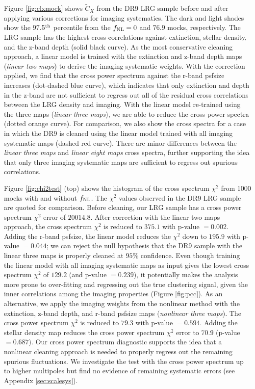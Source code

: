 Figure \ref{fig:clxmock} shows $\tilde{C}_{X}$ from the DR9 LRG sample before and after applying various corrections for imaging systematics. The dark and light shades show the 97.5$^{\rm th}$ percentile from the $f_{\rm NL}=0$ and $76.9$ mocks, respectively. The LRG sample has the highest cross-correlations against extinction, stellar density, and the z-band depth (solid black curve). As the most conservative cleaning approach, a linear model is trained with the extinction and z-band depth maps (\textit{linear two maps}) to derive the imaging systematic weights. With the correction applied, we find that the cross power spectrum against the r-band psfsize increases (dot-dashed blue curve), which indicates that only extinction and depth in the z-band are not sufficient to regress out all of the residual cross correlations between the LRG density and imaging. With the linear model re-trained using the three maps (\textit{linear three maps}), we are able to reduce the cross power spectra (dotted orange curve). For comparison, we also show the cross spectra for a case in which the DR9 is cleaned using the linear model trained with all imaging systematic maps (dashed red curve). There are minor differences between the \textit{linear three maps} and \textit{linear eight maps} cross spectra, further supporting the idea that only three imaging systematic maps are sufficient to regress out spurious correlations.

Figure \ref{fig:chi2test} (top)  shows the histogram of the cross spectrum $\chi^{2}$ from 1000 mocks with and without $f_{\rm NL}$. The $\chi^{2}$ values observed in the DR9 LRG sample are quoted for comparison. Before cleaning, our LRG sample has a cross power spectrum $\chi^{2}$ error of $20014.8$. After correction with the linear two maps approach, the cross spectrum $\chi^{2}$ is reduced to $375.1$ with p-value $=0.002$. Adding the r-band psfsize, the linear model reduces the $\chi^{2}$ down to $195.9$ with p-value $=0.044$; we can reject the null hypothesis that the DR9 sample with the linear three maps is properly cleaned at $95\%$ confidence. Even though training the linear model with all imaging systematic maps as input gives the lowest cross spectrum $\chi^{2}$ of $129.2$ (and p-value $=0.239$), it potentially makes the analysis more prone to over-fitting and regressing out the true clustering signal, given the inner correlations among the imaging properties (Figure \ref{fig:pcc}). As an alternative, we apply the imaging weights from the nonlinear method with the extinction, z-band depth, and r-band psfsize maps (\textit{nonlinear three maps}). The cross power spectrum $\chi^{2}$ is reduced to $79.3$ with p-value $=0.594$.  Adding the stellar density map reduces the cross power spectrum $\chi^{2}$ error to $70.9$ (p-value $=0.687$). Our cross power spectrum diagnostic supports the idea that a nonlinear cleaning approach is needed to properly regress out the remaining spurious fluctuations. We investigate the test with the cross power spectrum up to higher multipoles but find no evidence of remaining systematic errors (see Appendix \ref{sec:scalesys}). 


